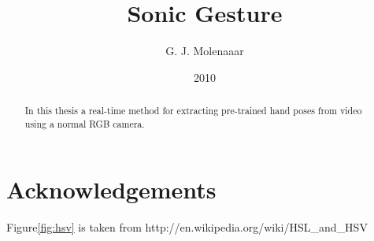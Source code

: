 \documentclass[a4paper]{report}
\begin{document}
\title{Sonic Gesture}
\author{G. J. Molenaaar}
\date{2010}

\maketitle

\tableofcontents
\listoffigures
\listoftables

\chapter*{Acknowledgements}
Figure\ref{fig:hsv} is taken from http://en.wikipedia.org/wiki/HSL\_and\_HSV

\begin{abstract}
In this thesis a real-time method for extracting pre-trained hand poses from
video using a normal RGB camera. 
\end{abstract}










%
%
%





\end{document}
